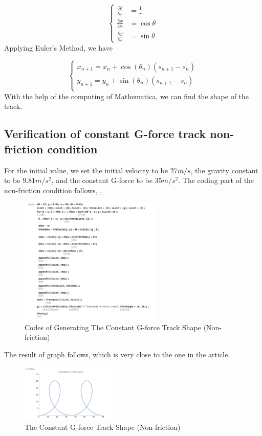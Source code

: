 \documentclass{article}
\begin{document}
$$ \left\{
\begin{aligned}
\frac{\partial \theta}{\partial s} & = \frac{1}{r} \\
\frac{\partial x}{\partial s} & =  \cos \theta \\
\frac{\partial y}{\partial s} & =  \sin \theta
\end{aligned}
\right.
$$
Applying Euler's Method, we have

$$ \left\{
\begin{aligned}
x_{n+1}=x_{n}+ \cos (\theta_{n})(s_{n+1}-s_{n}) \\
y_{n+1}=y_{n}+ \sin (\theta_{n})(s_{n+1}-s_{n}) \\
\end{aligned}
\right.
$$
With the help of the computing of Mathematica, we can find the shape of the track.

\subsection{Verification of constant G-force track non-friction condition}

For the initial value, we set the initial velocity to be $27m/s$, the gravity constant to be $9.81m/s^2$, and the constant G-force to be $35m/s^2$. The coding part of the non-friction condition follows, ,

\begin{figure}[H]
    \centering
    \includegraphics[width=0.6\textwidth]{2.png}
    \caption{Codes of Generating The Constant G-force Track Shape (Non-friction)}
    \end{figure}  


The result of graph follows, which is very close to the one in the article.

\begin{figure}[H]
    \centering
    \includegraphics[width=0.4\textwidth]{3.png}
    \caption{The Constant G-force Track Shape (Non-friction)}
    \end{figure}  
\end{document}
